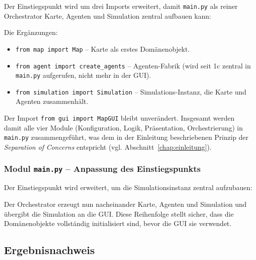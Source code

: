 Der Einstiegspunkt wird um drei Imports erweitert, damit \texttt{main.py} als reiner Orchestrator Karte, Agenten und Simulation zentral aufbauen kann:



Die Ergänzungen:
\begin{itemize}
    \item \texttt{from map import Map} – Karte als erstes Domänenobjekt.
    \item \texttt{from agent import create\_agents} – Agenten-Fabrik (wird seit 1c zentral in \texttt{main.py} aufgerufen, nicht mehr in der GUI).
    \item \texttt{from simulation import Simulation} – Simulations-Instanz, die Karte und Agenten zusammenhält.
\end{itemize}

Der Import \texttt{from gui import MapGUI} bleibt unverändert. Insgesamt werden damit alle vier Module (Konfiguration, Logik, Präsentation, Orchestrierung) in \texttt{main.py} zusammengeführt, was dem in der Einleitung beschriebenen Prinzip der \textit{Separation of Concerns} entspricht (vgl. Abschnitt~\ref{chap:einleitung}).


\subsubsection{Modul \texttt{main.py} – Anpassung des Einstiegspunkts}

Der Einstiegspunkt wird erweitert, um die Simulationsinstanz zentral aufzubauen:



Der Orchestrator erzeugt nun nacheinander Karte, Agenten und Simulation und übergibt die Simulation an die GUI. Diese Reihenfolge stellt sicher, dass die Domänenobjekte vollständig initialisiert sind, bevor die \acs{GUI} sie verwendet.


\subsection{Ergebnisnachweis}
\label{sssec:simulation_ergebnisnachweis}

